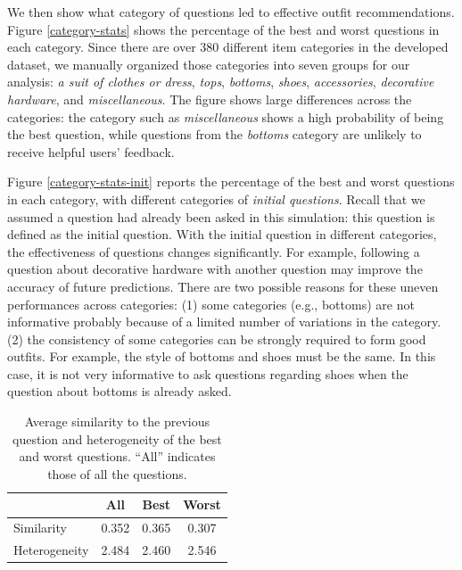 We then show what category of questions led to effective outfit  recommendations.
Figure \ref{category-stats} shows the percentage of the best and worst questions in each category.
Since there are over 380 different item categories in the developed dataset, 
we manually organized those categories into seven groups for our analysis: \textit{a suit of clothes or dress}, \textit{tops}, \textit{bottoms}, \textit{shoes}, \textit{accessories}, \textit{decorative hardware}, and \textit{miscellaneous}. 
The figure shows large differences across the categories:
the category such as \textit{miscellaneous} shows a high probability of being the best question, while questions from the \textit{bottoms} category are unlikely to receive helpful users' feedback.


Figure \ref{category-stats-init} reports the percentage of 
the best and worst questions in each category,
with different categories of {\it initial questions}. 
Recall that we assumed a question had already been asked in this simulation: 
this question is defined as the initial question.
With the initial question in different categories, 
the effectiveness of questions changes significantly.
For example, following a question about decorative hardware with another question may improve the accuracy of future predictions.
There are two possible reasons for these uneven performances across categories: 
(1) some categories (e.g., bottoms) are not informative probably because of a limited number of variations in the category.
(2) the consistency of some categories can be strongly required to form good outfits. 
For example, the style of bottoms and shoes must be the same. 
In this case, it is not very informative to ask questions regarding shoes when the question about bottoms is already asked. 

\begin{table}[t]
\caption{Average similarity to the previous question and heterogeneity of the best and worst questions.
``All'' indicates those of all the questions.}
\centering
\begin{tabular}{lccc}
\toprule
                       & All   & Best & Worst \\ \midrule
Similarity & 0.352 & 0.365        & 0.307         \\
Heterogeneity            & 2.484 & 2.460        & 2.546         \\
\bottomrule
\end{tabular}
\label{dis-sim}
\end{table}


